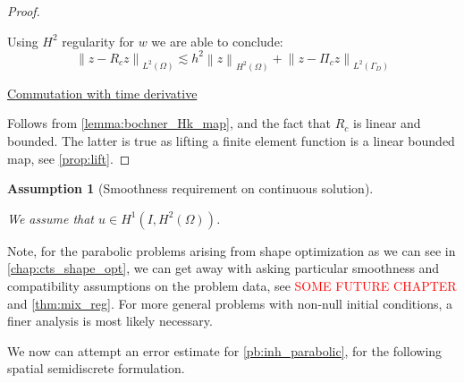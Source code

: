 \documentclass[english,a4paper,10pt,oneside]{scrbook}	%
\theoremstyle{break}
\newtheorem{ass}[equation]{Assumption}
\newenvironment{mproof}[1][\proofname]{%
  \begin{proof}[#1]$ $\par\nobreak\ignorespaces
}{%
  \end{proof}
}
\renewcommand*{\proofname}{Proof}
\theoremstyle{remark}
\newcommand{\norm}[1]{\left\lVert#1\right\rVert}
\begin{document}
\begin{mproof}
Using $H^2$ regularity for $w$ we are able to conclude:
$$\norm{z-R_c z}_{L^2(\Omega)}\lesssim h^2\norm{z}_{H^2(\Omega)} + \norm{z-\Pi_c z}_{L^2(\Gamma_D)} $$

\underline{Commutation with time derivative}

Follows from \cref{lemma:bochner_Hk_map}, and the fact that $R_c$ is linear and bounded. The latter is true as lifting a finite element function is a linear bounded map, see \cref{prop:lift}.

\end{mproof}

\begin{ass}[Smoothness requirement on continuous solution]
\label{ass:smoothness_par_discr}

We assume that $u \in H^1(I, H^2(\Omega))$.
\end{ass}

Note, for the parabolic problems arising from shape optimization as we can see in \cref{chap:cts_shape_opt}, we can get away with asking particular smoothness and compatibility assumptions on the problem data, see \textcolor{red}{SOME FUTURE CHAPTER} and \cref{thm:mix_reg}. For more general problems with non-null initial conditions, a finer analysis is most likely necessary.

We now can attempt an error estimate for \cref{pb:inh_parabolic}, for the following spatial semidiscrete formulation.
\end{document}
